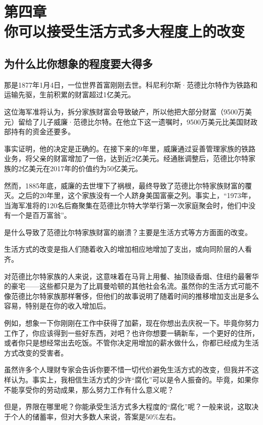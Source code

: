 \section[第四章\q 你可以接受生活方式多大程度上的改变]{第四章\\ 你可以接受生活方式多大程度上的改变}
\renewcommand{\bookchapter}{4}
\setcounter{figure}{0}
\setcounter{table}{0}
\subsection{为什么比你想象的程度要大得多}
那是1877年1月4日，一位世界首富刚刚去世。科尼利尔斯·范德比尔特作为铁路和运输先驱，生前积累的财富超过1亿美元。

这位海军准将认为，拆分家族财富会导致破产，所以他把大部分财富（9500万美元）留给了儿子威廉·范德比尔特。在他立下这一遗嘱时，9500万美元比美国财政部持有的资金还要多。

事实证明，他的决定是正确的。在接下来的9年里，威廉通过妥善管理家族的铁路业务，将父亲的财富增加了一倍，达到近2亿美元。经通胀调整后，范德比尔特家族的2亿美元在2017年的价值约为50亿美元。

然而，1885年底，威廉的去世埋下了祸根，最终导致了范德比尔特家族财富的覆灭。之后的20年里，这个家族没有一个人跻身美国富豪之列。事实上，“1973年，当海军准将的120名后裔聚集在范德比尔特大学举行第一次家庭聚会时，他们中没有一个是百万富翁”。

是什么导致了范德比尔特家族财富的崩溃？主要是生活方式等方方面面的改变。

生活方式的改变是指人们随着收入的增加相应地增加了支出，或向同阶层的人看齐。

对范德比尔特家族的人来说，这意味着在马背上用餐、抽顶级香烟、住纽约最奢华的豪宅——这些都只是为了比肩曼哈顿的其他社会名流。虽然你的生活方式可能不像范德比尔特家族那样奢侈，但他们的故事说明了随着时间的推移增加支出是多么容易，特别是在你的收入增加后。

例如，想象一下你刚刚在工作中获得了加薪，现在你想出去庆祝一下。毕竟你努力工作了，你应该得到一些好东西，对吧？也许你想要一辆新车，一个更好的住所，或者你只是想经常出去吃饭。不管你决定用增加的薪水做什么，你都已经成为生活方式改变的受害者。

虽然许多个人理财专家会告诉你要不惜一切代价避免生活方式的改变，但我并不这样认为。事实上，我相信生活方式的少许“腐化”可以是令人振奋的。毕竟，如果你不能享受你的劳动成果，那么努力工作有什么意义呢？

但是，界限在哪里呢？你能承受生活方式多大程度的“腐化”呢？一般来说，这取决于个人的储蓄率，但对大多数人来说，答案是50\%左右。


